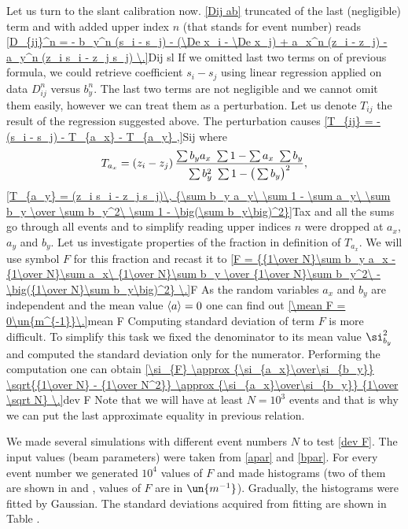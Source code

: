 Let us turn to the slant calibration now. \Equ{} \ref{Dij ab} truncated of the last (negligible) term and
with added upper index $n$ (that stands for event number) reads
\eqref{D_{ij}^n = - b_y^n (s_i - s_j) - (\De x_i - \De x_j) + a_x^n (z_i - z_j) - a_y^n (z_i s_i - z_j s_j) \.}{Dij sl}
If we omitted last two terms on \rhs{} of previous formula, we could retrieve coefficient $s_i - s_j$ using linear
regression applied on data $D_{ij}^n$ versus $b_y^n$. The last two terms are not negligible and we cannot
omit them easily, however we can treat them as a perturbation. Let us denote $T_{ij}$ the result of the regression
suggested above. The perturbation causes
\eqref{T_{ij} = - (s_i - s_j) - T_{a_x} - T_{a_y} ,}{Sij}
where
$$T_{a_x} = (z_i - z_j)\, {\sum b_y a_x\ \sum 1 - \sum a_x\ \sum b_y \over \sum b_y^2\ \sum 1 - \big(\sum b_y\big)^2},$$
\eqref{T_{a_y} = (z_i s_i - z_j s_j)\, {\sum b_y a_y\ \sum 1 - \sum a_y\ \sum b_y \over \sum b_y^2\ \sum 1 - \big(\sum b_y\big)^2}}{Tax}
and all the sums go through all events and to simplify reading upper indices $n$ were dropped at $a_x$, $a_y$ and $b_y$.
Let us investigate properties of the fraction in definition of $T_{a_x}$. We will use symbol $F$ for this
fraction and recast it to
\eqref{F = {{1\over N}\sum b_y a_x - {1\over N}\sum a_x\ {1\over N}\sum b_y \over {1\over N}\sum b_y^2\ - \big({1\over N}\sum b_y\big)^2} \.}{F}
As the random variables $a_x$ and $b_y$ are independent and the mean value $\left\langle a\right\rangle = 0$ one can find out
\eqref{\mean F = 0\un{m^{-1}}\.}{mean F}
Computing standard deviation of term $F$ is more difficult. To simplify this task we fixed the denominator to its mean value $\si_{b_y}^2$ and computed the standard deviation only for the numerator. Performing the computation one can obtain
\eqref{\si_{F} \approx {\si_{a_x}\over\si_{b_y}} \sqrt{{1\over N} - {1\over N^2}} \approx {\si_{a_x}\over\si_{b_y}} {1\over \sqrt N} \.}{dev F}
Note that we will have at least $N = 10^3$ events and that is why we can put the last approximate equality
in previous relation.

We made several simulations with different event numbers $N$ to test \equ{} \ref{dev F}. The input values (beam parameters) were taken from \equs{} \ref{apar} and \ref{bpar}. For every event number we generated $10^4$ values of $F$ and made histograms (two of them are shown in \fgs{}  and , values of $F$ are in $\un{m^{-1}}$). Gradually, the histograms were fitted by Gaussian. The standard deviations acquired from fitting are shown in Table .
\bmfig
{}
\emfig

